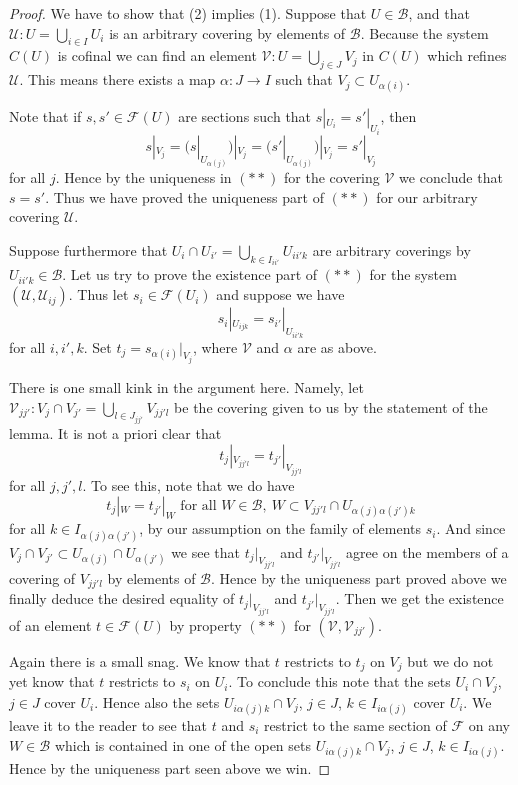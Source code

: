 \begin{proof}
We have to show that (2) implies (1).
Suppose that $U \in \mathcal{B}$, and that
$\mathcal{U} : U = \bigcup_{i\in I} U_i$ is an arbitrary covering
by elements of $\mathcal{B}$.  Because the system $C(U)$ is cofinal
we can find an element $\mathcal{V} : U = \bigcup_{j \in J} V_j$
in $C(U)$ which refines $\mathcal{U}$. This means there exists
a map $\alpha : J \to I$ such that $V_j \subset U_{\alpha(i)}$.

\medskip\noindent
Note that if $s, s' \in \mathcal{F}(U)$ are sections such
that $s|_{U_i} = s'|_{U_i}$, then
$$
s|_{V_j}
= (s|_{U_{\alpha(j)}})|_{V_j}
= (s'|_{U_{\alpha(j)}})|_{V_j}
= s'|_{V_j}
$$
for all $j$. Hence by the uniqueness in $(**)$
for the covering $\mathcal{V}$ we conclude that $s = s'$.
Thus we have proved the uniqueness part of $(**)$
for our arbitrary covering $\mathcal{U}$.

\medskip\noindent
Suppose furthermore that $U_i \cap U_{i'} = \bigcup_{k \in I_{ii'}} U_{ii'k}$
are arbitrary coverings by $U_{ii'k} \in \mathcal{B}$.
Let us try to prove the existence part of $(**)$ for the system
$(\mathcal{U}, \mathcal{U}_{ij})$. Thus let $s_i \in \mathcal{F}(U_i)$
and suppose we have
$$
s_i|_{U_{ijk}} = s_{i'}|_{U_{ii'k}}
$$
for all $i, i', k$. Set $t_j = s_{\alpha(i)}|_{V_j}$, where $\mathcal{V}$
and $\alpha$ are as above.

\medskip\noindent
There is one small kink in the argument here. Namely, let
$\mathcal{V}_{jj'} : V_j \cap V_{j'} = \bigcup_{l \in J_{jj'}} V_{jj'l}$
be the covering given to us by the statement of the lemma.
It is not a priori clear that
$$
t_j|_{V_{jj'l}} = t_{j'}|_{V_{jj'l}}
$$
for all $j, j', l$. To see this, note that we do have
$$
t_j|_W = t_{j'}|_W \text{ for all } W \in \mathcal{B}, \ 
W \subset V_{jj'l} \cap U_{\alpha(j)\alpha(j')k}
$$
for all $k \in I_{\alpha(j)\alpha(j')}$, by our assumption on
the family of elements $s_i$. And since
$V_j \cap V_{j'} \subset U_{\alpha(j)} \cap U_{\alpha(j')}$
we see that $t_j|_{V_{jj'l}}$ and $t_{j'}|_{V_{jj'l}}$
agree on the members of a covering of $V_{jj'l}$ by
elements of $\mathcal{B}$. Hence by the uniqueness part proved above
we finally deduce the desired equality of
$t_j|_{V_{jj'l}}$ and $t_{j'}|_{V_{jj'l}}$.
Then we get the existence of an element $t \in \mathcal{F}(U)$
by property $(**)$ for $(\mathcal{V}, \mathcal{V}_{jj'})$.

\medskip\noindent
Again there is a small snag. We know that $t$ restricts to $t_j$ on $V_j$
but we do not yet know that $t$ restricts to $s_i$ on $U_i$. To conclude
this note that the sets $U_i \cap V_j$, $j \in J$ cover $U_i$. Hence
also the sets $U_{i \alpha(j) k} \cap V_j$, $j\in J$, $k \in I_{i\alpha(j)}$
cover $U_i$. We leave it to the reader to see that $t$ and $s_i$ restrict
to the same section of $\mathcal{F}$ on any $W \in \mathcal{B}$
which is contained in one of the open sets
$U_{i \alpha(j) k} \cap V_j$, $j\in J$, $k \in I_{i\alpha(j)}$.
Hence by the uniqueness part seen above we win.
\end{proof}

